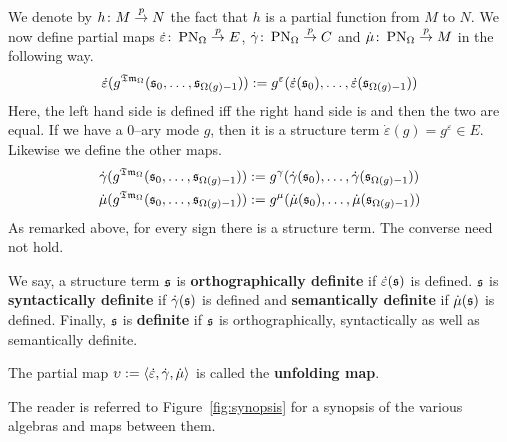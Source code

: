 We denote by $h \colon M \stackrel{p}{\rightarrow} N$ the fact that $h$
is a partial function from $M$ to $N$. We now define
partial maps $\dot{\varepsilon} \colon \operatorname{PN}_{\Omega} 
\stackrel{p}{\rightarrow} E$, $\dot{\gamma} \colon \operatorname{PN}_{\Omega} 
\stackrel{p}{\rightarrow} C$ and $\dot{\mu} \colon \operatorname{PN}_{\Omega}
\stackrel{p}{\rightarrow} M$ in the following way.
\begin{equation}
\dot{\varepsilon}(g^{\mathfrak{Tm}_{\Omega}}(\mathfrak{s}_0, \dotsc, \mathfrak{s}_{\Omega(g)-1}))
    := g^{\varepsilon}(\dot{\varepsilon}(\mathfrak{s}_0), \dotsc,
    \dot{\varepsilon}(\mathfrak{s}_{\Omega(g)-1}))
\end{equation}
Here, the left hand side is defined iff the right hand
side is and then the two are equal. If we have a 0--ary mode $g$,
then it is a structure term $\dot{\varepsilon}(g) = g^{\varepsilon}
\in E$. Likewise we define the other maps.
\begin{align}
\dot{\gamma}(g^{\mathfrak{Tm}_{\Omega}}(\mathfrak{s}_0, \dotsc, \mathfrak{s}_{\Omega(g)-1}))
    & := g^{\gamma}(\dot{\gamma}(\mathfrak{s}_0), \dotsc,
    \dot{\gamma}(\mathfrak{s}_{\Omega(g)-1})) \\
\dot{\mu}(g^{\mathfrak{Tm}_{\Omega}}(\mathfrak{s}_0, \dotsc, \mathfrak{s}_{\Omega(g)-1}))
    & := g^{\mu}(\dot{\mu}(\mathfrak{s}_0), \dotsc,
    \dot{\mu}(\mathfrak{s}_{\Omega(g)-1}))
\end{align}
As remarked above, for every sign there is a structure term.
The converse need not hold.
\begin{defn}
We say, a structure term $\mathfrak{s}$ is
\textbf{orthographically definite} if $\dot{\varepsilon}(\mathfrak{s})$
is defined. $\mathfrak{s}$ is \textbf{syntactically definite} %
if $\dot{\gamma}(\mathfrak{s})$ is defined and \textbf{semantically definite}
if $\dot{\mu}(\mathfrak{s})$ is defined. Finally, $\mathfrak{s}$ is
\textbf{definite}
if $\mathfrak{s}$ is orthographically, syntactically as well as semantically
definite.
\end{defn}
\begin{defn}
\index{$\upsilon$}%
The partial map $\upsilon := \langle \dot{\varepsilon},
\dot{\gamma}, \dot{\mu}\rangle$ is called the \textbf{unfolding map}.
\end{defn}
The reader is referred to Figure~\ref{fig:synopsis} for a synopsis 
of the various algebras and maps between them.
